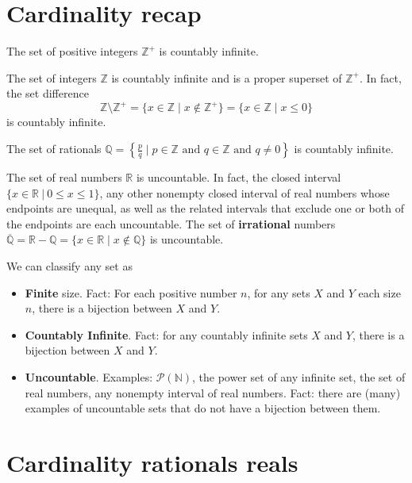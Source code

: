 \documentclass[12pt, oneside]{article}
\begin{document}
\begin{flushright}
\end{flushright} \section*{Cardinality recap}



The set of positive integers $\mathbb{Z}^{+}$ is countably infinite.

The set of integers $\mathbb{Z}$ is countably infinite and is a proper superset of $\mathbb{Z}^{+}$. 
In fact, the set difference 
$$\mathbb{Z} \setminus \mathbb{Z}^{+} = \{ x \in \mathbb{Z} \mid x \notin \mathbb{Z}^+\} 
= \{ x \in \mathbb{Z} \mid x \leq 0 \}$$ is countably infinite.

The set of rationals 
$\mathbb{Q} = \left\{ \frac{p}{q} \mid p \in \mathbb{Z}  \text{ and  } 
q  \in \mathbb{Z} \text{ and } q \neq  0 \right\}$ is countably infinite.


The set of real numbers $\mathbb{R}$ is uncountable. In fact, the closed 
interval $\{x \in \mathbb{R} ~|~ 0 \leq x \leq 1\}$, 
any other nonempty closed interval of real numbers whose endpoints are 
unequal, as well as the related intervals that exclude one or both of the endpoints are
each uncountable.
The set of {\bf irrational} numbers $\overline{\mathbb{Q}} = \mathbb{R} - \mathbb{Q}
= \{ x \in \mathbb{R} \mid x \notin \mathbb{Q} \}$ is uncountable.

\vfill

We can classify any set as 
\begin{itemize}
\item {\bf Finite} size. Fact: For each positive number $n$, for any sets $X$ and $Y$ each 
size $n$, there is a bijection between $X$ and $Y$.
\item {\bf Countably Infinite}. Fact: for any countably infinite sets $X$ and $Y$, there is a bijection
between $X$ and $Y$.
\item {\bf Uncountable}. Examples: $\mathcal{P}(\mathbb{N})$, the power set of any infinite set, 
the set of real numbers, any nonempty interval of real numbers. Fact: there are (many) examples 
of uncountable sets that do not have a bijection between them.
\end{itemize} \vfill
\section*{Cardinality rationals reals}
\end{document}
